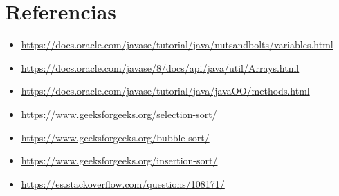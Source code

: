 \documentclass{article}
\begin{document}
\clearpage


\section{Referencias}
\begin{itemize}			
    \item \url{https://docs.oracle.com/javase/tutorial/java/nutsandbolts/variables.html}
    \item \url{https://docs.oracle.com/javase/8/docs/api/java/util/Arrays.html}
    \item \url{https://docs.oracle.com/javase/tutorial/java/javaOO/methods.html}
    \item \url{https://www.geeksforgeeks.org/selection-sort/}
    \item \url{https://www.geeksforgeeks.org/bubble-sort/}
    \item \url{https://www.geeksforgeeks.org/insertion-sort/}
    \item \url{https://es.stackoverflow.com/questions/108171/}
\end{itemize}	
	
%
%
%
			
\end{document}
